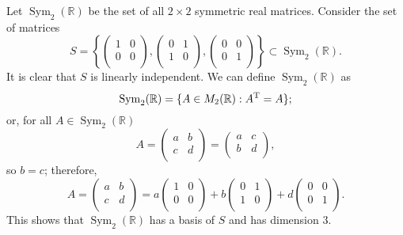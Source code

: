 \begin{example}
    Let $\operatorname{Sym}_2(\mathbb{R})$ be the set of all $2 \times 2$ symmetric real matrices. Consider the set of matrices 
    \[
        S =
        \left\{
            \begin{pmatrix}
                1 & 0 \\
                0 & 0 \\
            \end{pmatrix}
            , 
            \begin{pmatrix}
                0 & 1 \\
                1 & 0 \\
            \end{pmatrix}
            , 
            \begin{pmatrix}
                0 & 0 \\
                0 & 1 \\
            \end{pmatrix}
        \right\}
        \subset \operatorname{Sym}_2(\mathbb{R}).
    \]
    It is clear that $S$ is linearly independent. We can define $\operatorname{Sym}_2(\mathbb{R})$ as \[\operatorname{Sym}_2(\mathbb{R}) = \{A \in M_2(\mathbb{R}) : A^{\rm{T}} = A\};\] or, for all $A \in \operatorname{Sym}_2(\mathbb{R})$ 
    \[
        A =
        \begin{pmatrix}
            a & b \\
            c & d \\
        \end{pmatrix}
        =
        \begin{pmatrix}
            a & c \\
            b & d \\
        \end{pmatrix}
        ,
    \]
    so $b=c$; therefore,
    \[
        A =
        \begin{pmatrix}
            a & b \\
            c & d \\
        \end{pmatrix}
        = a
        \begin{pmatrix}
            1 & 0 \\
            0 & 0 \\
        \end{pmatrix}
        + b
        \begin{pmatrix}
            0 & 1 \\
            1 & 0 \\
        \end{pmatrix}
        + d
        \begin{pmatrix}
            0 & 0 \\
            0 & 1 \\
        \end{pmatrix}
        .
    \]
    This shows that $\operatorname{Sym}_2(\mathbb{R})$ has a basis of $S$ and has dimension $3$.
\end{example}

